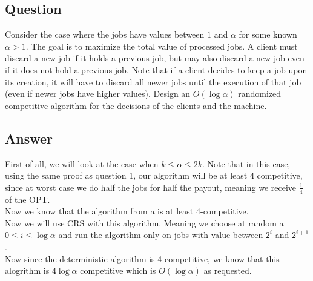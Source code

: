 \subsection*{Question}
Consider the case where the jobs have values between $1$ and $\alpha$ for some known $\alpha > 1$. The goal is to maximize the total value of processed jobs. A client must discard a new job if it holds a previous job, but may also discard a new job even if it does not hold a previous job. Note that if a client decides to keep a job upon its creation, it will have to discard all newer jobs until the execution of that job (even if newer jobs have higher values). Design an $O(\log \alpha)$ randomized competitive algorithm for the decisions of the clients and the machine.
\subsection*{Answer}
First of all, we will look at the case when $k \leq \alpha \leq 2k$. Note that in this case, using the same proof as question 1, our algorithm will be at least 4 competitive, since at worst case we do half the jobs for half the payout, meaning we receive $\frac{1}{4}$ of the OPT.\\
Now we know that the algorithm from a is at least 4-competitive.\\
Now we will use CRS with this algorithm. Meaning we choose at random a $0 \leq i \leq \log \alpha$ and run the algorithm only on jobs with value between $2^i$ and $2^{i+1}$.\\
Now since the deterministic algorithm is 4-competitive, we know that this alogrithm is $4\log \alpha$ competitive which is $O(\log \alpha)$ as requested.